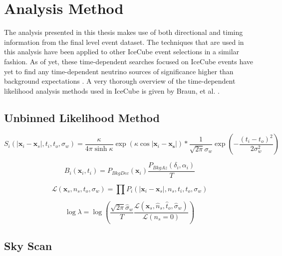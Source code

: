 \documentclass{gatech-thesis}
\begin{document}
\chapter{Analysis Method}
The analysis presented in this thesis makes use of both directional and timing information from the final level event dataset. The techniques that are used in this analysis have been applied to other IceCube event selections in a similar fashion. As of yet, these time-dependent searches focused on IceCube events have yet to find any time-dependent neutrino sources of significance higher than background expectations \cite{}. A very thorough overview of the time-dependent likelihood analysis methods used in IceCube is given by Braun, et al. \cite{2010APh....33..175B}. 


\section{Unbinned Likelihood Method}

\begin{equation}
S_i(|\mathbf{x}_i-\mathbf{x}_s|,t_i,t_o,\sigma_w) = \frac{\kappa}{4\pi \sinh \kappa} \exp \left(\kappa \cos |\mathbf{x}_i-\mathbf{x_s}|\right) * \frac{1}{\sqrt{2\pi}\sigma_w} \exp \left(-\frac{(t_i-t_o)^2}{2 \sigma_w^2}\right)
\end{equation}


\begin{equation}
B_i(\mathbf{x}_i,t_i) = P_{BkgDec}\left(\mathbf{x}_i\right)\frac{P_{BkgAz}(\delta_i,\alpha_i)}{T}
\end{equation}

\begin{equation}
\mathcal{L}(\mathbf{x}_s,n_s,t_o,\sigma_w) = \prod P_i(|\mathbf{x}_i-\mathbf{x}_s|,n_s,t_i,t_o,\sigma_w)
\end{equation}

\begin{equation}
\log \lambda = \log \left(\frac{\sqrt{2\pi}\hat{\sigma}_w}{T}\frac{\mathcal{L}(\mathbf{x}_s,\hat{n}_s,\hat{t}_o,\hat{\sigma}_w)}{\mathcal{L}(n_s = 0)} \right)
\end{equation}


\section{Sky Scan}
\end{document}
